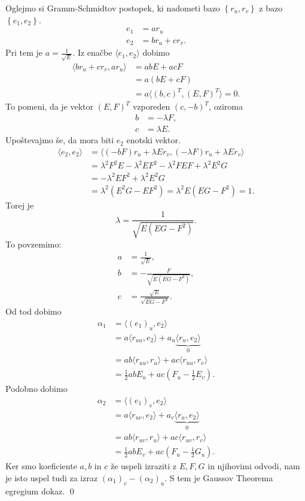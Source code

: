 Oglejmo si Gramm-Schmidtov postopek, ki nadometi bazo $\left\{ r_u, r_v\right\}$ z bazo $\left\{ e_1, e_2 \right\} $. \begin{align*}
    e_1 &= a r_u   \\
    e_2 &= b r_u + c r_v.
\end{align*}
Pri tem je $a = \frac{1}{\sqrt{E} }$. Iz enačbe $\langle e_1, e_2 \rangle$ dobimo \begin{align*}
    \langle b r_u + c r_v, a r_u \rangle  &= ab E + ac F  \\
     &= a(bE + cF) \\
     &= a \langle (b, c)^{T}, (E, F)^{T} \rangle = 0. 
\end{align*}
To pomeni, da je vektor $(E, F)^{T}$ vzporeden $(c, -b)^{T}$, oziroma \begin{align*}
    b &= -\lambda F, \\
    c &= \lambda E.
\end{align*}
Upoštevajmo še, da mora biti $e_2$ enotski vektor. \begin{align*}
    \langle e_2, e_2 \rangle  &= \langle (-bF)r_u + \lambda E r_v, (-\lambda F) r_u + \lambda E r_v \rangle   \\
     &= \lambda^2 F^2 E - \lambda^2 E F^2 - \lambda^2 FEF + \lambda^2 E^2 G \\
     &= -\lambda^2 E F^2 + \lambda^2 E^2 G \\
     &= \lambda^2 (E^2 G - EF^2 ) = \lambda^2  E (EG - F^2) = 1.
\end{align*}
Torej je \begin{equation*}
\lambda = \frac{1}{\sqrt{E (EG - F^2)}}.
\end{equation*}  
To povzemimo: \begin{align*}
    a &= \frac{1}{\sqrt{E}}, \\
    b  &= -\frac{F}{\sqrt{E (EG - F^2)}}, \\
    c &= \frac{\sqrt{E}}{\sqrt{EG - F^2}}.
\end{align*}
Od tod dobimo \begin{align*}
    \alpha_1 &= \langle (e_1)_u, e_2 \rangle  \\
     &= a \langle r_{uu}, e_2 \rangle + a_u \underbrace{\langle r_u, e_2 \rangle}_0  \\
    &= ab \langle r_{uu}, r_u \rangle + ac \langle r_{uu}, r_v \rangle \\
    &= \frac{1}{2} ab E_u + ac (F_u - \frac{1}{2} E_v). 
\end{align*}
Podobno dobimo \begin{align*}
    \alpha_2 &= \langle (e_1)_v, e_2 \rangle  \\
     &= a \langle r_{uv}, e_2 \rangle + a_v \underbrace{\langle r_u, e_2 \rangle}_0  \\
    &= ab \langle r_{uv}, r_u \rangle + ac \langle r_{uv}, r_v \rangle \\
    &= \frac{1}{2} ab E_v + ac (F_u - \frac{1}{2} G_u). 
\end{align*}
Ker smo koeficiente $a, b$ in $c$ že uspeli izraziti z $E, F, G$ in njihovimi odvodi, nam je isto uspel tudi za izraz $(\alpha_1)_v - (\alpha_2)_u$.
S tem je Gaussov Theorema egregium dokaz.
\qed

